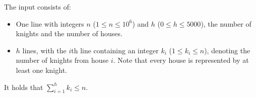 
  The input consists of:
  \begin{itemize}
    \item One line with integers $n$ ($1 \leq n \leq 10^6$) and $h$
      ($0 \leq h \leq 5000$), the number of knights and the
      number of houses.
    \item $h$ lines, with the $i$th line containing an integer $k_i$ ($1 \leq k_i \leq n$),
      denoting the number of knights from house $i$. Note that every
      house is represented by at least one knight.
  \end{itemize}
  It holds that $\sum_{i=1}^h k_i \leq n$.
